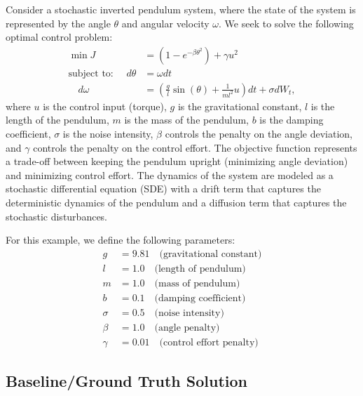 Consider a stochastic inverted pendulum system, where the state of the system is represented by the angle $\theta$ and angular velocity $\omega$. We seek to solve the following optimal control problem:
\begin{align}
    \min J &= (1 - e^{-\beta \theta^2}) + \gamma u^2 \label{eq:pendulum:objective}\\
    \text{subject to: } \quad d\theta &= \omega dt\label{eq:pendulum:dynamics1}\\
    \quad d\omega &= \left(\frac{g}{l} \sin(\theta) + \frac{1}{m l^2} u \right)dt + \sigma dW_{t} \label{eq:pendulum:dynamics2},
\end{align}
where $u$ is the control input (torque), $g$ is the gravitational constant, $l$ is the length of the pendulum, $m$ is the mass of the pendulum, $b$ is the damping coefficient, $\sigma$ is the noise intensity, $\beta$ controls the penalty on the angle deviation, and $\gamma$ controls the penalty on the control effort. The objective function represents a trade-off between keeping the pendulum upright (minimizing angle deviation) and minimizing control effort. The dynamics of the system are modeled as a stochastic differential equation (SDE) with a drift term that captures the deterministic dynamics of the pendulum and a diffusion term that captures the stochastic disturbances.

For this example, we define the following parameters:
\begin{align*}
    g &= 9.81 \quad \text{(gravitational constant)}\\
    l &= 1.0 \quad \text{(length of pendulum)}\\
    m &= 1.0 \quad \text{(mass of pendulum)}\\
    b &= 0.1 \quad \text{(damping coefficient)}\\
    \sigma &= 0.5 \quad \text{(noise intensity)}\\
    \beta &= 1.0 \quad \text{(angle penalty)}\\
    \gamma &= 0.01 \quad \text{(control effort penalty)}
\end{align*}

\subsection{Baseline/Ground Truth Solution}

